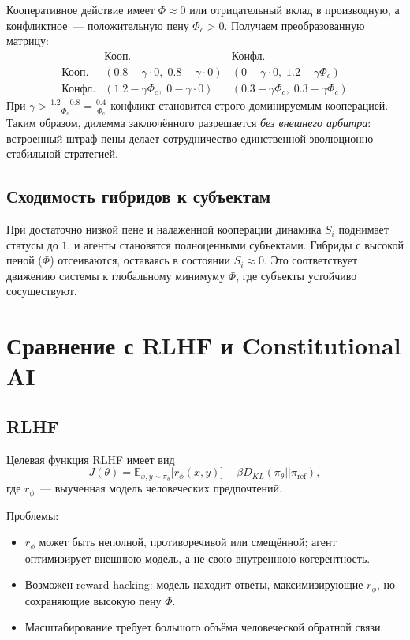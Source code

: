 \documentclass[11pt,a4paper]{article}
\begin{document}
Кооперативное действие имеет $\Phi\approx0$ или отрицательный вклад в производную, а конфликтное~--- положительную пену $\Phi_c>0$.
Получаем преобразованную матрицу:
\begin{equation}
\begin{array}{c|cc}
 & \text{Кооп.} & \text{Конфл.} \\\hline
\text{Кооп.} &
(0.8-\gamma\cdot0,\;0.8-\gamma\cdot0) &
(0-\gamma\cdot0,\;1.2-\gamma\Phi_c) \\
\text{Конфл.} &
(1.2-\gamma\Phi_c,\;0-\gamma\cdot0) &
(0.3-\gamma\Phi_c,\;0.3-\gamma\Phi_c)
\end{array}
\end{equation}
При $\gamma > \frac{1.2-0.8}{\Phi_c} = \frac{0.4}{\Phi_c}$ конфликт становится строго доминируемым кооперацией.
Таким образом, дилемма заключённого разрешается \emph{без внешнего арбитра}: встроенный штраф пены делает сотрудничество единственной эволюционно стабильной стратегией.

\subsection{Сходимость гибридов к субъектам}

При достаточно низкой пене и налаженной кооперации динамика $S_i$ поднимает статусы до $1$, и агенты становятся полноценными субъектами.
Гибриды с высокой пеной ($\Phi$) отсеиваются, оставаясь в состоянии $S_i\approx 0$.
Это соответствует движению системы к глобальному минимуму $\Phi$, где субъекты устойчиво сосуществуют.

\section{Сравнение с RLHF и Constitutional AI}

\subsection{RLHF}

Целевая функция RLHF имеет вид
\begin{equation}
J(\theta) = \mathbb{E}_{x,y\sim\pi_\theta}\big[r_\phi(x,y)\big] - \beta D_{KL}(\pi_\theta || \pi_{\text{ref}}),
\end{equation}
где $r_\phi$~--- выученная модель человеческих предпочтений.

Проблемы:
\begin{itemize}
\item $r_\phi$ может быть неполной, противоречивой или смещённой; агент оптимизирует внешнюю модель, а не свою внутреннюю когерентность.
\item Возможен reward hacking: модель находит ответы, максимизирующие $r_\phi$, но сохраняющие высокую пену $\Phi$.
\item Масштабирование требует большого объёма человеческой обратной связи.
\end{itemize}
\end{document}
